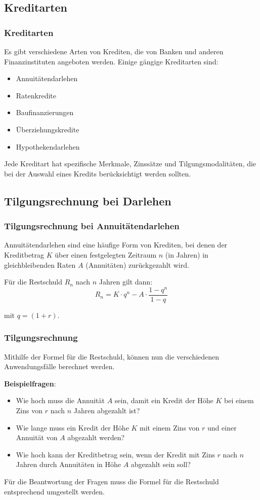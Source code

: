 \documentclass{beamer}
\begin{document}
\subsection{Kreditarten}
\begin{frame}
  \frametitle{Kreditarten}
  
  Es gibt verschiedene Arten von Krediten, die von Banken und anderen Finanzinstituten angeboten werden. Einige gängige Kreditarten sind:
  
  \begin{itemize}
    \item Annuitätendarlehen
    \item Ratenkredite
    \item Baufinanzierungen
    \item Überziehungskredite
    \item Hypothekendarlehen
  \end{itemize}
  
  Jede Kreditart hat spezifische Merkmale, Zinssätze und Tilgungsmodalitäten, die bei der Auswahl eines Kredits berücksichtigt werden sollten.
\end{frame}

\subsection{Tilgungsrechnung bei Darlehen}
\begin{frame}
  \frametitle{Tilgungsrechnung bei Annuitätendarlehen}
  
  Annuitätendarlehen sind eine häufige Form von Krediten, bei denen der Kreditbetrag $K$ über einen festgelegten Zeitraum $n$ (in Jahren) in gleichbleibenden Raten $A$ (Annuitäten) zurückgezahlt wird.

  \vspace{1cm}

  Für die Restschuld $R_n$ nach $n$ Jahren gilt dann: 
  $$R_n = K \cdot q^n - A \cdot \frac{1-q^n}{1-q}$$

  mit $q=(1+r)$.
\end{frame}

\begin{frame}
  \frametitle{Tilgungsrechnung}  
  Mithilfe der Formel für die Restschuld, können nun die verschiedenen Anwendungsfälle berechnet werden.

  \vspace{1cm}
  \textbf{Beispielfragen}:
  \begin{itemize}
    \item Wie hoch muss die Annuität $A$ sein, damit ein Kredit der Höhe $K$ bei einem Zins von $r$ nach $n$ Jahren abgezahlt ist?
    \item Wie lange muss ein Kredit der Höhe $K$ mit einem Zins von $r$ und einer Annuität von $A$ abgezahlt werden?
    \item Wie hoch kann der Kreditbetrag sein, wenn der Kredit mit Zins $r$ nach $n$ Jahren durch Annuitäten in Höhe $A$ abgezahlt sein soll?
  \end{itemize}
  Für die Beantwortung der Fragen muss die Formel für die Restschuld entsprechend umgestellt werden.
\end{frame}
\end{document}
